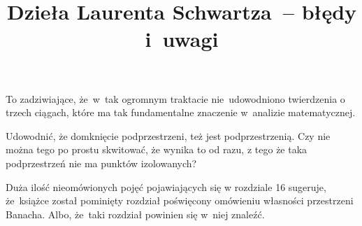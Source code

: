 \documentclass[a4paper,11pt]{article}
\title{Dzieła Laurenta Schwartza~-- błędy i~uwagi}
\begin{document}



\maketitle %









To zadziwiające, że~w~tak ogromnym traktacie nie~udowodniono
twierdzenia o trzech ciągach, które ma tak fundamentalne znaczenie
w~analizie matematycznej.

\vspace{\spaceThree}


Udowodnić, że domknięcie podprzestrzeni, też jest
podprzestrzenią. Czy nie można tego po prostu skwitować, że wynika to
od razu, z tego że taka podprzestrzeń nie ma punktów izolowanych?

\vspace{\spaceThree}

Duża ilość nieomówionych pojęć pojawiających się w rozdziale 16
sugeruje, że~książce został pominięty rozdział poświęcony omówieniu
własności przestrzeni Banacha. Albo, że~taki rozdział powinien się w~niej znaleźć.

\vspace{\spaceThree}








\end{document}
